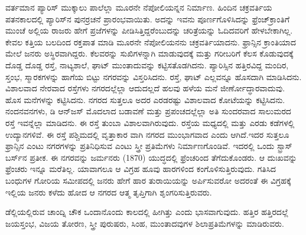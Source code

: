ವರ್ತಮಾನ ಪ್ಯಾರಿಸ್​ ಮುಕ್ಕಾಲು ಪಾಲೆಲ್ಲಾ ಮೂರನೇ ನೆಪೋಲಿಯನ್ನನ ನಿರ್ಮಾಣ. ಹಿಂದಿನ ಚಕ್ರವರ್ತಿಯ ಪತನಕಾಲದಲ್ಲಿ ಪ್ಯಾರಿಸ್​ನ ಪುನರ್ರಚನೆ ಪ್ರಾರಂಭವಾಯಿತು. ಅದನ್ನು ಇವನು ಪೂರ್ಣಗೊಳಿಸಿದನ್ನು ಫ್ರೆಂಚ್​ ಕ್ರಾಂತಿಗೆ ಮುಂಚೆ ಅಲ್ಲಿಯ ರಾಜರು ಹೇಗೆ ಪ್ರಜೆಗಳನ್ನು ಪೀಡಿಸಿತ್ತಿದ್ದರೆಂಬುದನ್ನು ಚರಿತ್ರೆಯನ್ನು ಓದಿದವರಿಗೆ ಹೇಳಬೇಕಾಗಿಲ್ಲ. ಕೇವಲ ಕತ್ತಿಯ ಬಲದಿಂದ ರಕ್ತಪಾತ ಮಾಡಿ ಮೂರನೇ ನೆಪೋಲಿಯನನು ಚಕ್ರವರ್ತಿಯಾದನು. ಫ್ರಾನ್ಸಿನ ಕ್ರಾಂತಿಯಾದ ಮೇಲೆ ಜನರು ಅಸ್ಥಿರವಾಗಿದ್ದರು. ಕೆಲವರನ್ನು ಸುಖಿಗಳನ್ನಾಗಿ ಮಾಡುವುದಕ್ಕೆ ಮತ್ತು ಗರೀಬರಿಗೆ ಕೆಲಸ ಕೊಡುವುದಕ್ಕೆ ದೊಡ್ಡ ದೊಡ್ಡ ರಸ್ತೆ, ನಾಟ್ಯಶಾಲೆ, ಘಾಟ್​ ಮುಂತಾದುವನ್ನು ಕಟ್ಟಿಸತೊಡಗಿದನು. ಪ್ಯಾರಿಸ್ಸಿನ ಹತ್ತಿರವಿದ್ದ ಮಂದಿರ, ಸ್ತಂಭ, ಸ್ಮಾರಕಗಳನ್ನು ಹಾಗೆಯ ಬಿಟ್ಟು ನಗರವನ್ನು ವಿಸ್ತರಿಸಿದನು. ರಸ್ತೆ, ಘಾಟ್​ ಎಲ್ಲವನ್ನೂ ಹೊಸದಾಗಿ ಮಾಡಿಸಿದನು. ವಿಶಾಲವಾದ ನೇರವಾದ ರಸ್ತೆಗಳು ನಗರದಲ್ಲೆಲ್ಲಾ ಆದುದಲ್ಲದೆ ಹಲವು ಹಳೆಯ ಮನೆ ಜೀರ್ಣೋದ್ಧಾರವಾದುವು. ಹೊಸ ಮನೆಗಳನ್ನು ಕಟ್ಟಿಸಿದನು. ನಗರದ ಸುತ್ತಲೂ ಅದರ ಎರಡರಷ್ಟು ವಿಶಾಲವಾದ ಕೋಟೆಯನ್ನು ಕಟ್ಟಿಸಿದನು. ನಂದನವನಗಳು, ಡಿ ಆನ್​ಜಸ್​ ಮೊದಲಾದ ಬಡಾವಣೆ ಮತ್ತು ಪ್ರಪಂಚದಲ್ಲೆಲ್ಲಾ ಅತಿ ಸುಂದರವಾದ ಸಾಲುಮರದ ರಸ್ತೆ  ಇವನ್ನೆಲ್ಲಾ ಮಾಡಿದನು. ಈ ರಸ್ತೆ ತುಂಬಾ ವಿಶಾಲವಾಗಿರುವುದು. ರಸ್ತೆಯ ಮಧ್ಯದಲ್ಲಿ ಮತ್ತು ಎರಡು ಕಡೆಗಳಲ್ಲಿ ಉದ್ಯಾನಗಳಿವೆ. ಈ ರಸ್ತೆ ಪಶ್ಚಿಮದಲ್ಲಿ ವೃತ್ತಾಕಾರ ವಾಗಿ ನಗರದ ಮುಂಭಾಗವಾದ  ಎಂದು ಆಗಿದೆ.ಇದರ ಸುತ್ತಲೂ ಫ್ರಾನ್ಸಿನ ಎಂಟು ನಗರಗಳನ್ನು ಪ್ರತಿನಿಧಿಸುವ ಎಂಟು ಸ್ತ್ರೀ ಪ್ರತಿಮೆಗಳು ನಿರ್ಮಾಣಗೊಂಡಿವೆ. ಇದರಲ್ಲಿ ಒಂದು ಸ್ಟ್ರಾಸ್​ ಬರ್ಸ್​ನ ಪ್ರತೀಕ. ಈ ನಗರವನ್ನು ಜರ್ಮನರು (1870) ಯುದ್ಧದಲ್ಲಿ ಫ್ರೆಂಚರಿಂದ ತೆಗೆದುಕೊಂಡರು. ಆ ದುಃಖವನ್ನು ಫ್ರೆಂಚರು ಇನ್ನೂ ಮರೆತಿಲ್ಲ. ಯಾವಾಗಲೂ ಆ ವಿಗ್ರಹ ಹೂವು ಹಾರಗಳಿಂದ ಕಂಗೊಳಿಸುತ್ತಿರುವುದು. ಗತಿಸಿದ ಬಂಧುಗಳ ಗೋರಿಯ ಸಮೀಪದಲ್ಲಿ ಜನರು ಹೇಗೆ ಹಾರ ತುರಾಯಿಯನ್ನು ಅರ್ಪಿಸುವರೋ ಅದರಂತೆ ಈ ವಿಗ್ರಹಕ್ಕೆ ಇಲ್ಲಿಯ ಜನರು ಕಳೆದು ಹೋದ ಆ ನಗರದ ಆತ್ಮ ತೃಪ್ತಿಗಾಗಿ ಶೃಂಗರಿಸುತ್ತಿರುವರು.

ಡೆಲ್ಲಿಯಲ್ಲಿರುವ ಚಾಂದ್ನಿ ಚೌಕ ಒಂದಾನೊಂದು ಕಾಲದಲ್ಲಿ ಹೀಗಿತ್ತು ಎಂದು ಭಾಸವಾಗುವುದು. ಹತ್ತಿರ ಹತ್ತಿರದಲ್ಲೆ ಜಯಸ್ತಂಭ, ವಿಜಯ ತೋರಣ, ಸ್ತ್ರೀ ಪುರುಷರು, ಸಿಂಹ, ಮುಂತಾದವುಗಳ ಶಿಲಾಪ್ರತಿಮೆಗಳನ್ನು ಮಾಡಿರುವರು.

